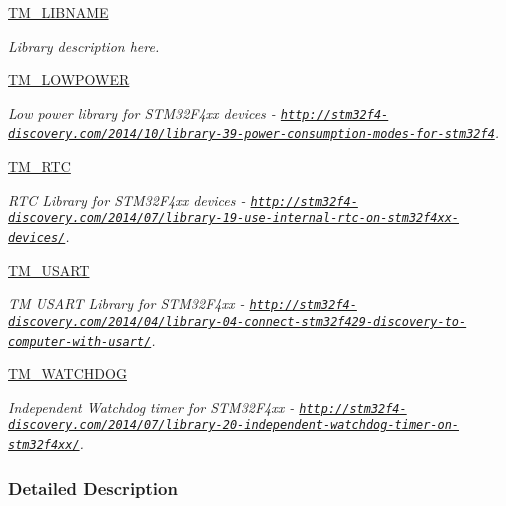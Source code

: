\begin{DoxyCompactItemize}
\hyperlink{group___t_m___l_i_b_n_a_m_e}{T\+M\+\_\+\+L\+I\+B\+N\+A\+M\+E}
\begin{DoxyCompactList}\small\item\em Library description here. \end{DoxyCompactList}\item 
\hyperlink{group___t_m___l_o_w_p_o_w_e_r}{T\+M\+\_\+\+L\+O\+W\+P\+O\+W\+E\+R}
\begin{DoxyCompactList}\small\item\em Low power library for S\+T\+M32\+F4xx devices -\/ \href{http://stm32f4-discovery.com/2014/10/library-39-power-consumption-modes-for-stm32f4}{\tt http\+://stm32f4-\/discovery.\+com/2014/10/library-\/39-\/power-\/consumption-\/modes-\/for-\/stm32f4}. \end{DoxyCompactList}\item 
\hyperlink{group___t_m___r_t_c}{T\+M\+\_\+\+R\+T\+C}
\begin{DoxyCompactList}\small\item\em R\+T\+C Library for S\+T\+M32\+F4xx devices -\/ \href{http://stm32f4-discovery.com/2014/07/library-19-use-internal-rtc-on-stm32f4xx-devices/}{\tt http\+://stm32f4-\/discovery.\+com/2014/07/library-\/19-\/use-\/internal-\/rtc-\/on-\/stm32f4xx-\/devices/}. \end{DoxyCompactList}\item 
\hyperlink{group___t_m___u_s_a_r_t}{T\+M\+\_\+\+U\+S\+A\+R\+T}
\begin{DoxyCompactList}\small\item\em T\+M U\+S\+A\+R\+T Library for S\+T\+M32\+F4xx -\/ \href{http://stm32f4-discovery.com/2014/04/library-04-connect-stm32f429-discovery-to-computer-with-usart/}{\tt http\+://stm32f4-\/discovery.\+com/2014/04/library-\/04-\/connect-\/stm32f429-\/discovery-\/to-\/computer-\/with-\/usart/}. \end{DoxyCompactList}\item 
\hyperlink{group___t_m___w_a_t_c_h_d_o_g}{T\+M\+\_\+\+W\+A\+T\+C\+H\+D\+O\+G}
\begin{DoxyCompactList}\small\item\em Independent Watchdog timer for S\+T\+M32\+F4xx -\/ \href{http://stm32f4-discovery.com/2014/07/library-20-independent-watchdog-timer-on-stm32f4xx/}{\tt http\+://stm32f4-\/discovery.\+com/2014/07/library-\/20-\/independent-\/watchdog-\/timer-\/on-\/stm32f4xx/}. \end{DoxyCompactList}\end{DoxyCompactItemize}


\subsubsection{Detailed Description}
